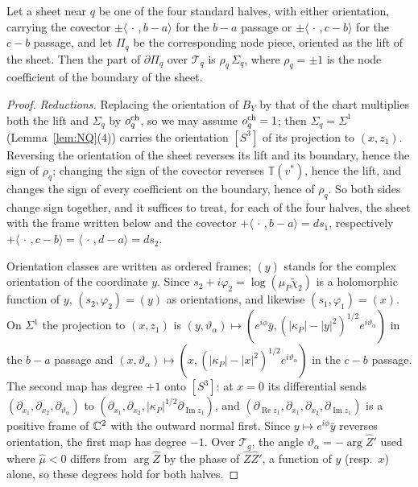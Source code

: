 \begin{lemma}\label{lem:SI}
Let a sheet near $q$ be one of the four standard halves, with either orientation, carrying the covector
$\pm\langle\,\cdot\,,b-a\rangle$ for the $b-a$ passage or $\pm\langle\,\cdot\,,c-b\rangle$ for the $c-b$ passage, and let
$\Pi_q$ be the corresponding node piece, oriented as the lift of the sheet. Then the part of $\partial\Pi_q$ over
$\mathscr T_q$ is $\rho_q\,\Sigma_q$, where $\rho_q=\pm1$ is the node coefficient of the boundary of the sheet.
\end{lemma}

\begin{proof}
\emph{Reductions.} Replacing the orientation of $B_Y$ by that of the chart multiplies both the lift and $\Sigma_q$ by
$o^{\rm ch}_q$, so we may assume $o^{\rm ch}_q=1$; then $\Sigma_q=\Sigma^1$ (Lemma~\ref{lem:NQ}(4)) carries the orientation
$[S^3]$ of its projection to $(x,z_1)$. Reversing the orientation of the sheet reverses its lift and its boundary, hence
the sign of $\rho_q$; changing the sign of the covector reverses $\mathbb T(v^*)$, hence the lift, and changes the sign of
every coefficient on the boundary, hence of $\rho_q$. So both sides change sign together, and it suffices to treat, for each
of the four halves, the sheet with the frame written below and the covector $+\langle\,\cdot\,,b-a\rangle=ds_1$, respectively
$+\langle\,\cdot\,,c-b\rangle=\langle\,\cdot\,,d-a\rangle=ds_2$.

Orientation classes are written as ordered frames; $(y)$ stands for the complex orientation of the coordinate $y$. Since
$s_2+i\varphi_2=\log(\mu_P\tilde\chi_2)$ is a holomorphic function of $y$, $(s_2,\varphi_2)=(y)$ as orientations, and
likewise $(s_1,\varphi_1)=(x)$. On $\Sigma^1$ the projection to $(x,z_1)$ is
$(y,\vartheta_\alpha)\mapsto(e^{i\phi}\bar y,(|\kappa_P|-|y|^2)^{1/2}e^{i\vartheta_\alpha})$ in the $b-a$ passage and
$(x,\vartheta_\alpha)\mapsto(x,(|\kappa_P|-|x|^2)^{1/2}e^{i\vartheta_\alpha})$ in the $c-b$ passage. The second map has degree
$+1$ onto $[S^3]$: at $x=0$ its differential sends $(\partial_{x_1},\partial_{x_2},\partial_{\vartheta_\alpha})$ to
$(\partial_{x_1},\partial_{x_2},|\kappa_P|^{1/2}\partial_{\operatorname{Im}z_1})$, and
$(\partial_{\operatorname{Re}z_1},\partial_{x_1},\partial_{x_2},\partial_{\operatorname{Im}z_1})$ is a positive frame of $\mathbb C^2$ with the
outward normal first. Since $y\mapsto e^{i\phi}\bar y$ reverses orientation, the first map has degree $-1$. Over
$\mathscr T_q$, the angle $\vartheta_\alpha=-\arg\hat Z'$ used where $\hat\mu<0$ differs from $\arg\hat Z$ by the phase of
$\hat Z\hat Z'$, a function of $y$ (resp.\ $x$) alone, so these degrees hold for both halves.


\end{proof}
